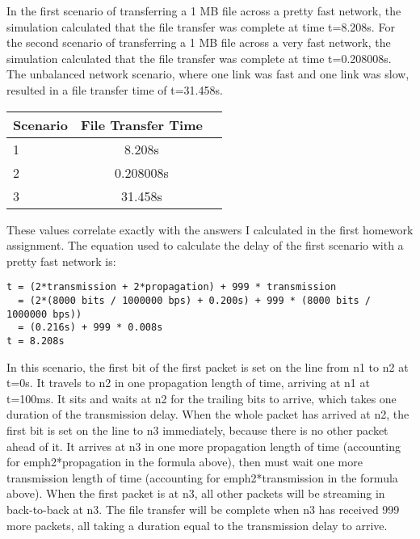 \documentclass[11pt]{article}
\begin{document}
In the first scenario of transferring a 1 MB file across a pretty fast network, the simulation calculated that the file transfer was complete at time t=8.208s. For the second scenario of transferring a 1 MB file across a very fast network, the simulation calculated that the file transfer was complete at time t=0.208008s. The unbalanced network scenario, where one link was fast and one link was slow, resulted in a file transfer time of t=31.458s.

\vspace{0.5cm}
\begin{absolutelynopagebreak}
\begin{tabular}{lcc}
  \toprule
  Scenario & File Transfer Time\\
  \midrule
  1 & 8.208s \\
  2 & 0.208008s \\
  3 & 31.458s \\
  \bottomrule
\end{tabular}
\end{absolutelynopagebreak}
\vspace{0.5cm}

These values correlate exactly with the answers I calculated in the first homework assignment. The equation used to calculate the delay of the first scenario with a pretty fast network is:

\vspace{5mm}
\begin{absolutelynopagebreak}
\begin{lstlisting}
t = (2*transmission + 2*propagation) + 999 * transmission
  = (2*(8000 bits / 1000000 bps) + 0.200s) + 999 * (8000 bits / 1000000 bps))
  = (0.216s) + 999 * 0.008s
t = 8.208s
\end{lstlisting}
\end{absolutelynopagebreak}
\vspace{5mm}

In this scenario, the first bit of the first packet is set on the line from n1 to n2 at t=0s. It travels to n2 in one propagation length of time, arriving at n1 at t=100ms. It sits and waits at n2 for the trailing bits to arrive, which takes one duration of the transmission delay. When the whole packet has arrived at n2, the first bit is set on the line to n3 immediately, because there is no other packet ahead of it. It arrives at n3 in one more propagation length of time (accounting for emph{2*propagation} in the formula above), then must wait one more transmission length of time (accounting for emph{2*transmission} in the formula above). When the first packet is at n3, all other packets will be streaming in back-to-back at n3. The file transfer will be complete when n3 has received 999 more packets, all taking a duration equal to the transmission delay to arrive.
\end{document}
